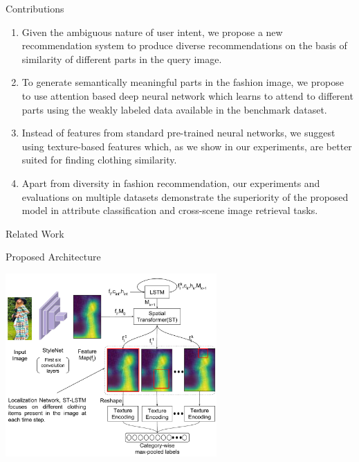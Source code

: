 \documentclass[handout]{beamer}
\begin{document}
\begin{frame}{Contributions}
  \begin{enumerate}
    \item Given the ambiguous nature of user intent, we propose a new recommendation system to produce diverse recommendations on the basis of similarity of different parts in the query image.

    \item To generate semantically meaningful parts in the fashion image, we propose to use attention based deep neural network which learns to attend to different parts using the weakly labeled data available in the benchmark dataset.

    \item Instead of features from standard pre-trained neural networks, we suggest using texture-based features which, as we show in our experiments, are better suited for finding clothing similarity.

    \item Apart from diversity in fashion recommendation, our experiments and evaluations on multiple datasets demonstrate the superiority of the proposed model in attribute classification and cross-scene image retrieval tasks.
  \end{enumerate}
\end{frame}

\begin{frame}{Related Work}

\end{frame}

\begin{frame}{Proposed Architecture}
  \vspace{-1cm}
    \begin{center}
      \includegraphics[width=0.8\linewidth, height=7cm]{images/staqu_st_ten_arch}
    \end{center}
\end{frame}
\end{document}
